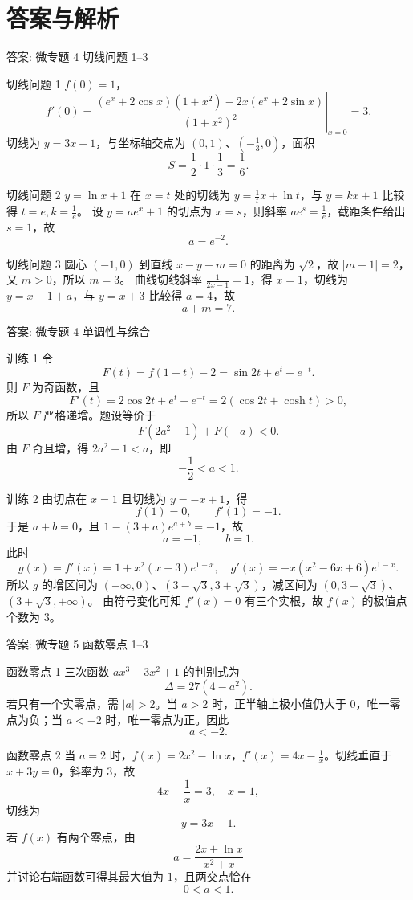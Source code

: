 ﻿\documentclass[aspectratio=169,10pt]{ctexbeamer}
\begin{document}
\iffalse
\section{答案与解析}

\begin{frame}[t]{答案: 微专题 4 切线问题 1--3}
\tiny
\begin{block}{切线问题 1}
$f(0)=1$，
\[
f'(0)=\left.\frac{(e^x+2\cos x)(1+x^2)-2x(e^x+2\sin x)}{(1+x^2)^2}\right|_{x=0}=3.
\]
切线为 $y=3x+1$，与坐标轴交点为 $(0,1)$、$\left(-\frac13,0\right)$，面积
\[
S=\frac12\cdot 1\cdot \frac13=\frac16.
\]
\end{block}
\begin{block}{切线问题 2}
$y=\ln x+1$ 在 $x=t$ 处的切线为 $y=\frac1t x+\ln t$，与 $y=kx+1$ 比较得 $t=e,k=\frac1e$。
设 $y=ae^x+1$ 的切点为 $x=s$，则斜率 $ae^s=\frac1e$，截距条件给出 $s=1$，故
\[
a=e^{-2}.
\]
\end{block}
\begin{block}{切线问题 3}
圆心 $(-1,0)$ 到直线 $x-y+m=0$ 的距离为 $\sqrt2$，故 $|m-1|=2$，又 $m>0$，所以 $m=3$。
曲线切线斜率 $\frac1{2x-1}=1$，得 $x=1$，切线为 $y=x-1+a$，与 $y=x+3$ 比较得 $a=4$，故
\[
a+m=7.
\]
\end{block}
\end{frame}

\begin{frame}[t]{答案: 微专题 4 单调性与综合}
\tiny
\begin{block}{训练 1}
令
\[
F(t)=f(1+t)-2=\sin 2t+e^t-e^{-t}.
\]
则 $F$ 为奇函数，且
\[
F'(t)=2\cos 2t+e^t+e^{-t}=2(\cos 2t+\cosh t)>0,
\]
所以 $F$ 严格递增。题设等价于
\[
F(2a^2-1)+F(-a)<0.
\]
由 $F$ 奇且增，得 $2a^2-1<a$，即
\[
-\frac12<a<1.
\]
\end{block}
\begin{block}{训练 2}
由切点在 $x=1$ 且切线为 $y=-x+1$，得
\[
f(1)=0,\qquad f'(1)=-1.
\]
于是 $a+b=0$，且 $1-(3+a)e^{a+b}=-1$，故
\[
a=-1,\qquad b=1.
\]
此时
\[
g(x)=f'(x)=1+x^2(x-3)e^{1-x},\quad
g'(x)=-x(x^2-6x+6)e^{1-x}.
\]
所以 $g$ 的增区间为 $(-\infty,0)$、$(3-\sqrt3,3+\sqrt3)$，减区间为 $(0,3-\sqrt3)$、$(3+\sqrt3,+\infty)$。
由符号变化可知 $f'(x)=0$ 有三个实根，故 $f(x)$ 的极值点个数为 $3$。
\end{block}
\end{frame}

\begin{frame}[t]{答案: 微专题 5 函数零点 1--3}
\tiny
\begin{block}{函数零点 1}
三次函数 $ax^3-3x^2+1$ 的判别式为
\[
\Delta=27(4-a^2).
\]
若只有一个实零点，需 $|a|>2$。当 $a>2$ 时，正半轴上极小值仍大于 $0$，唯一零点为负；当 $a<-2$ 时，唯一零点为正。因此
\[
a<-2.
\]
\end{block}
\begin{block}{函数零点 2}
当 $a=2$ 时，$f(x)=2x^2-\ln x$，$f'(x)=4x-\frac1x$。切线垂直于 $x+3y=0$，斜率为 $3$，故
\[
4x-\frac1x=3,\quad x=1,
\]
切线为
\[
y=3x-1.
\]
若 $f(x)$ 有两个零点，由
\[
a=\frac{2x+\ln x}{x^2+x}
\]
并讨论右端函数可得其最大值为 $1$，且两交点恰在
\[
0<a<1.
\]
\end{block}
\end{frame}
\end{document}
